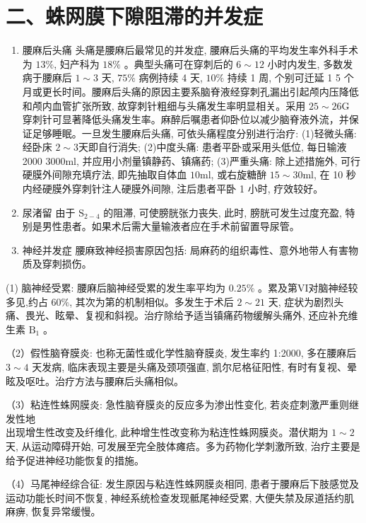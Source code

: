 \documentclass[10pt]{article}
\begin{document}
\section*{二、蛛网膜下隙阻滞的并发症}
\begin{enumerate}
  \item 腰麻后头痛 头痛是腰麻后最常见的并发症, 腰麻后头痛的平均发生率外科手术为 $13 \%$, 妇产科为 $18 \%$ 。典型头痛可在穿刺后的 $6 \sim 12$ 小时内发生, 多数发病于腰麻后 $1 \sim 3$ 天, $75 \%$ 病例持续 4 天, $10 \%$ 持续 1 周, 个别可迁延 1 5 个月或更长时间。腰麻后头痛的原因主要系脑脊液经穿刺孔漏出引起颅内压降低和颅内血管扩张所致, 故穿刺针粗细与头痛发生率明显相关。采用 $25 \sim 26 \mathrm{G}$ 穿刺针可显著降低头痛发生率。麻醉后嘱患者仰卧位以减少脑脊液外流，并保证足够睡眠。一旦发生腰麻后头痛, 可依头痛程度分别进行治疗: (1)轻微头痛: 经卧床 $2 \sim 3$天即自行消失; (2)中度头痛: 患者平卧或采用头低位, 每日输液 2000 3000ml, 并应用小剂量镇静药、镇痛药; (3)严重头痛: 除上述措施外, 可行硬膜外间隙充填疗法, 即先抽取自体血 $10 \mathrm{ml}$, 或右旋糖䣲 $15 \sim 30 \mathrm{ml}$, 在 10 秒内经硬膜外穿刺针注人硬膜外间隙, 注后患者平卧 1 小时, 疗效较好。

  \item 尿渚留 由于 $\mathrm{S}_{2-4}$ 的阻滞, 可使膀胱张力丧失, 此时, 膀胱可发生过度充盈, 特别是男性患者。如果术后需大量输液者应在手术前留置导尿管。

  \item 神经并发症 腰麻致神经损害原因包括: 局麻药的组织毒性、意外地带人有害物质及穿刺损伤。

\end{enumerate}

(1) 脑神经受累: 腰麻后脑神经受累的发生率平均为 $0.25 \%$ 。累及第VI对脑神经较多见,约占 $60 \%$, 其次为第的机制相似。多发生于术后 $2 \sim 21$ 天, 症状为剧烈头痛、畏光、眩晕、复视和斜视。治疗除给予适当镇痛药物缓解头痛外, 还应补充维生素 $\mathrm{B}_{1}$ 。

（2）假性脑脊膜炎: 也称无菌性或化学性脑脊膜炎, 发生率约 1:2000, 多在腰麻后 $3 \sim 4$ 天发病, 临床表现主要是头痛及颈项强直, 凯尔尼格征阳性, 有时有复视、晕眩及呕吐。治疗方法与腰麻后头痛相似。

（3）粘连性蛛网膜炎: 急性脑脊膜炎的反应多为渗出性变化, 若炎症刺激严重则继发性地\\
出现增生性改变及纤维化, 此种增生性改变称为粘连性蛛网膜炎。潜伏期为 $1 \sim 2$ 天, 从运动障碍开始, 可发展至完全肢体瘫㾑。多为药物化学刺激所致, 治疗主要是给予促进神经功能恢复的措施。

（4）马尾神经综合征: 发生原因与粘连性蛛网膜炎相同, 患者于腰麻后下肢感觉及运动功能长时间不恢复, 神经系统检查发现骶尾神经受累, 大便失禁及尿道括约肌麻痹, 恢复异常缓慢。
\end{document}

